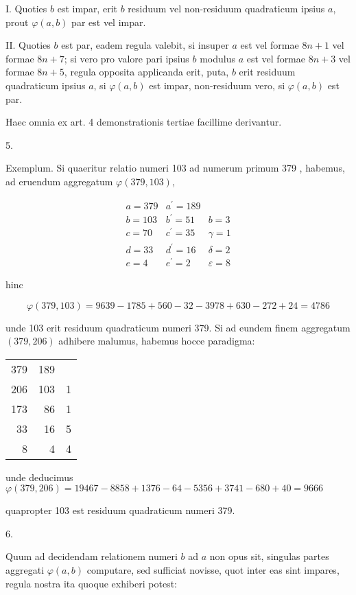 \documentclass[10pt]{article}
\begin{document}
I. Quoties \(b\) est impar, erit \(b\) residuum vel non-residuum quadraticum ipsius \(a\), prout \(\varphi(a, b)\) par est vel impar.

II. Quoties \(b\) est par, eadem regula valebit, si insuper \(a\) est vel formae \(8 n+1\) vel formae \(8 n+7\); si vero pro valore pari ipsius \(b\) modulus \(a\) est vel formae \(8 n+3\) vel formae \(8 n+5\), regula opposita applicanda erit, puta, \(b\) erit residuum quadraticum ipsius \(a\), si \(\varphi(a, b)\) est impar, non-residuum vero, si \(\varphi(a, b)\) est par.

Haec omnia ex art. 4 demonstrationis tertiae facillime derivantur.

5.

Exemplum. Si quaeritur relatio numeri 103 ad numerum primum 379 , habemus, ad eruendum aggregatum \(\varphi(379,103)\),

\[
\begin{array}{rr|r|l}
a=379 & a^{\prime}=189 & \\
b=103 & b^{\prime}=51 & b=3 \\
c=70 & c^{\prime}=35 & \gamma=1 \\
d=33 & d^{\prime}=16 & \delta=2 \\
e=4 & e^{\prime}=2 & \varepsilon=8
\end{array}
\]

hinc

\[
\varphi(379,103)=9639-1785+560-32-3978+630-272+24=4786
\]

unde 103 erit residuum quadraticum numeri 379. Si ad eundem finem aggregatum \((379,206)\) adhibere malumus, habemus hocce paradigma:

\begin{center}
\begin{tabular}{r|r|r}
379 & 189 &  \\
206 & 103 & 1 \\
173 & 86 & 1 \\
33 & 16 & 5 \\
8 & 4 & 4 \\
\end{tabular}
\end{center}

unde deducimus
\(\varphi(379,206)=19467-8858+1376-64-5356+3741-680+40=9666\)

quapropter 103 est residuum quadraticum numeri 379.

6.

Quum ad decidendam relationem numeri \(b\) ad \(a\) non opus sit, singulas partes aggregati \(\varphi(a, b)\) computare, sed sufficiat novisse, quot inter eas sint impares, regula nostra ita quoque exhiberi potest:
\end{document}
